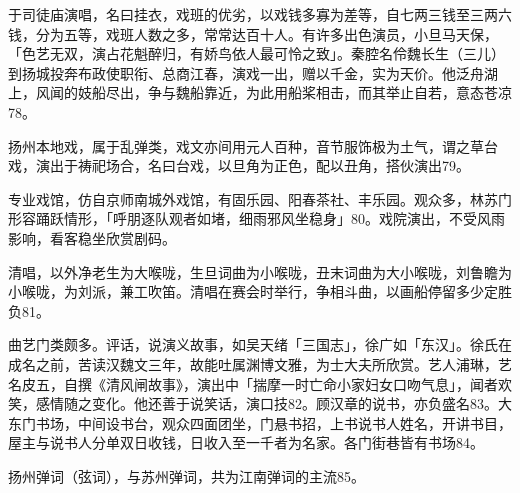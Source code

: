 \vfill
\begin{BookNotes}
\end{BookNotes}

\noindent 于司徒庙演唱，名曰挂衣，戏班的优劣，以戏钱多寡为差等，自七两三钱至三两六钱，分为五等，戏班人数之多，常常达百十人。有许多出色演员，小旦马天保，「色艺无双，演占花魁醉归，有娇鸟依人最可怜之致」。秦腔名伶魏长生（三儿）到扬城投奔布政使职衔、总商江春，演戏一出，赠以千金，实为天价。他泛舟湖上，风闻的妓船尽出，争与魏船靠近，为此用船桨相击，而其举止自若，意态苍凉78。

扬州本地戏，属于乱弹类，戏文亦间用元人百种，音节服饰极为土气，谓之草台戏，演出于祷祀场合，名曰台戏，以旦角为正色，配以丑角，搭伙演出79。

专业戏馆，仿自京师南城外戏馆，有固乐园、阳春茶社、丰乐园。观众多，林苏门形容踊跃情形，「呼朋逐队观者如堵，细雨邪风坐稳身」80。戏院演出，不受风雨影响，看客稳坐欣赏剧码。

清唱，以外净老生为大喉咙，生旦词曲为小喉咙，丑末词曲为大小喉咙，刘鲁瞻为小喉咙，为刘派，兼工吹笛。清唱在赛会时举行，争相斗曲，以画船停留多少定胜负81。

曲艺门类颇多。评话，说演义故事，如吴天绪「三国志」，徐广如「东汉」。徐氏在成名之前，苦读汉魏文三年，故能吐属渊博文雅，为士大夫所欣赏。艺人浦琳，艺名皮五，自撰《清风闸故事》，演出中「揣摩一时亡命小家妇女口吻气息」，闻者欢笑，感情随之变化。他还善于说笑话，演口技82。顾汉章的说书，亦负盛名83。大东门书场，中间设书台，观众四面团坐，门悬书招，上书说书人姓名，开讲书目，屋主与说书人分单双日收钱，日收入至一千者为名家。各门街巷皆有书场84。

\vfill
\begin{BookNotes}
\end{BookNotes}

扬州弹词（弦词），与苏州弹词，共为江南弹词的主流85。

